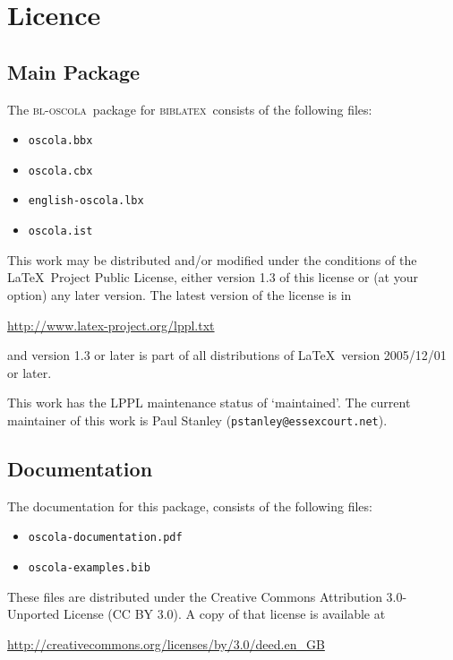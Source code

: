 \documentclass[a5paper,fontsize=9pt,DIV=1]{scrartcl}
\newcommand{\oscola}{\textsc{bl-oscola}}
\newcommand{\biblatex}{\textsc{biblatex}}
\begin{document}
\clearpage


\appendix

\section{Licence}

\subsection{Main Package}

The \oscola\ package for \biblatex\ consists of the following files:
\begin{itemize}
\item \texttt{oscola.bbx}
\item \texttt{oscola.cbx}
\item \texttt{english-oscola.lbx}
\item \texttt{oscola.ist}
\end{itemize}

This work may be distributed and\slash or modified under the conditions of the \LaTeX\ Project Public License, either version 1.3 of this license or (at your option) any later version. The latest version of the license is in
\begin{center}
\url{http://www.latex-project.org/lppl.txt}
\end{center}
and version 1.3 or later is part of all distributions of \LaTeX\ version 2005\slash 12\slash 01 or later.

This work has the LPPL maintenance status of `maintained'. The current maintainer of this work is Paul Stanley (\texttt{pstanley@essexcourt.net}).

\subsection{Documentation}

The documentation for this package, consists of the following files:
\begin{itemize}
\item \texttt{oscola-documentation.pdf}
\item \texttt{oscola-examples.bib}
\end{itemize}

These files are distributed under the Creative Commons Attribution 3.0-Unported License (CC BY 3.0). A copy of that license is available at
\begin{center}
\url{http://creativecommons.org/licenses/by/3.0/deed.en_GB}
\end{center}
\end{document}
